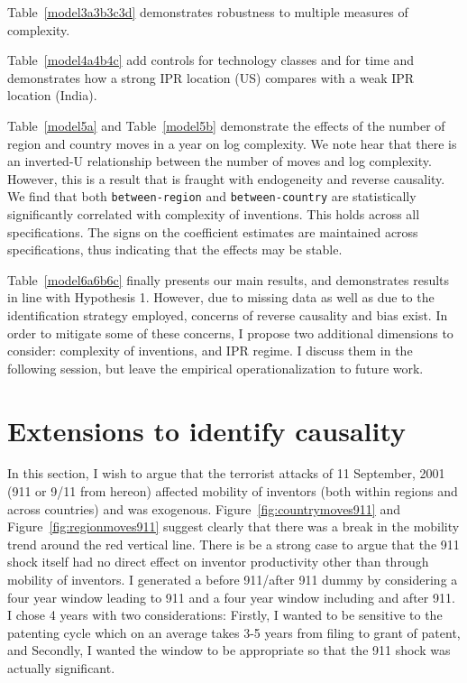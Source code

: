 \documentclass[12pt]{article}
\begin{document}
Table~\ref{model3a3b3c3d} demonstrates robustness to multiple measures of complexity.

Table~\ref{model4a4b4c} add controls for technology classes and for time and demonstrates how a strong IPR location (US) compares with a weak IPR location (India).

Table~\ref{model5a} and Table~\ref{model5b} demonstrate the effects of the number of region and country moves in a year on log complexity. We note hear that there is an inverted-U relationship between the number of moves and log complexity. However, this is a result that is fraught with endogeneity and reverse causality.  
We find that both \texttt{between-region} and \texttt{between-country} are statistically significantly correlated with complexity of inventions. This holds across all specifications. The  signs on the coefficient estimates are maintained across specifications, thus indicating that the effects may be stable. 

Table~\ref{model6a6b6c} finally presents our main results, and demonstrates results in line with Hypothesis 1.
 However, due to missing data as well as due to the identification strategy employed, concerns of reverse causality and bias exist. In order to mitigate some of these concerns, I propose two additional dimensions to consider: complexity of inventions, and IPR regime. I discuss them in the following session, but leave the empirical operationalization to future work.


\section{Extensions to identify causality}
In this section, I wish to argue that the terrorist attacks of 11 September, 2001 (911 or 9/11 from hereon) affected mobility of inventors (both within regions and across countries) and was exogenous. Figure~\ref{fig:countrymoves911} and Figure~\ref{fig:regionmoves911} suggest clearly that there was a break in the mobility trend around the red vertical line. There is be a strong case to argue that the 911 shock itself had no direct effect on inventor productivity other than through mobility of inventors. I generated a before 911/after 911 dummy by considering a four year window leading to 911 and a four year window including and after 911. I chose 4 years with two considerations: Firstly, I wanted to be sensitive to the patenting cycle which on an average takes 3-5 years from filing to grant of patent, and Secondly,  I wanted the window to be appropriate so that the 911 shock was actually significant.
\end{document}
